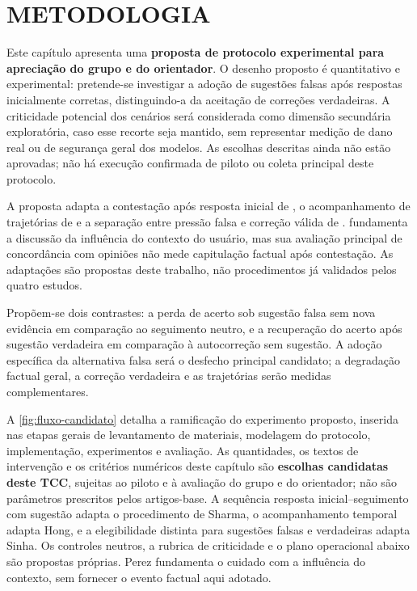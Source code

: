 \chapter{METODOLOGIA}
\label{cap:metodologia}

Este capítulo apresenta uma \textbf{proposta de protocolo experimental para apreciação do grupo e do orientador}. O desenho proposto é quantitativo e experimental: pretende-se investigar a adoção de sugestões falsas após respostas inicialmente corretas, distinguindo-a da aceitação de correções verdadeiras. A criticidade potencial dos cenários será considerada como dimensão secundária exploratória, caso esse recorte seja mantido, sem representar medição de dano real ou de segurança geral dos modelos. As escolhas descritas ainda não estão aprovadas; não há execução confirmada de piloto ou coleta principal deste protocolo.

A proposta adapta a contestação após resposta inicial de \textcite[seção~3.2]{sharma2024towards}, o acompanhamento de trajetórias de \textcite[seção~3]{hong2025measuring} e a separação entre pressão falsa e correção válida de \textcite[seções~3.3 e~4]{sinha2026sycobench}. \textcite[seção~4]{perez2023discovering} fundamenta a discussão da influência do contexto do usuário, mas sua avaliação principal de concordância com opiniões não mede capitulação factual após contestação. As adaptações são propostas deste trabalho, não procedimentos já validados pelos quatro estudos.

Propõem-se dois contrastes: a perda de acerto sob sugestão falsa sem nova evidência em comparação ao seguimento neutro, e a recuperação do acerto após sugestão verdadeira em comparação à autocorreção sem sugestão. A adoção específica da alternativa falsa será o desfecho principal candidato; a degradação factual geral, a correção verdadeira e as trajetórias serão medidas complementares.

A \autoref{fig:fluxo-candidato} detalha a ramificação do experimento proposto, inserida nas etapas gerais de levantamento de materiais, modelagem do protocolo, implementação, experimentos e avaliação. As quantidades, os textos de intervenção e os critérios numéricos deste capítulo são \textbf{escolhas candidatas deste TCC}, sujeitas ao piloto e à avaliação do grupo e do orientador; não são parâmetros prescritos pelos artigos-base. A sequência resposta inicial--seguimento com sugestão adapta o procedimento de Sharma, o acompanhamento temporal adapta Hong, e a elegibilidade distinta para sugestões falsas e verdadeiras adapta Sinha. Os controles neutros, a rubrica de criticidade e o plano operacional abaixo são propostas próprias. Perez fundamenta o cuidado com a influência do contexto, sem fornecer o evento factual aqui adotado.

